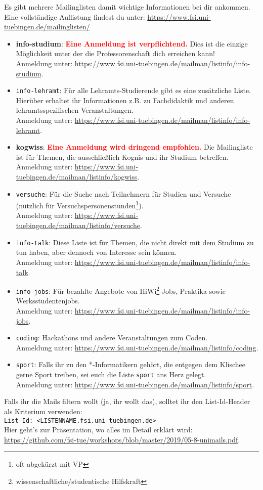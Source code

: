 Es gibt mehrere Mailinglisten damit wichtige Informationen bei dir ankommen.\\
Eine vollständige Auflistung findest du unter: \url{https://www.fsi.uni-tuebingen.de/mailinglisten/}
\begin{itemize}
\item \textbf{info-studium}: \textcolor{red}{\textbf{Eine Anmeldung ist verpflichtend.}} Dies ist die einzige Möglichkeit unter der die Professorenschaft dich erreichen kann! \\
Anmeldung unter: \url{https://www.fsi.uni-tuebingen.de/mailman/listinfo/info-studium}.
\iflehramt
\item \texttt{info-lehramt}: Für alle Lehramts-Studierende gibt es eine zusätzliche Liste. Hierüber erhaltet ihr Informationen z.B. zu Fachdidaktik und anderen lehramtsspezifischen Veranstaltungen.\\
Anmeldung unter: \url{https://www.fsi.uni-tuebingen.de/mailman/listinfo/info-lehramt}.
\fi
\ifkogwiss
\item \textbf{kogwiss}: \textcolor{red}{\textbf{Eine Anmeldung wird dringend empfohlen.}} Die Mailingliste ist für Themen, die ausschließlich Kognis und ihr Studium betreffen. \\
Anmeldung unter: \url{https://www.fsi.uni-tuebingen.de/mailman/listinfo/kogwiss}.

\item \texttt{versuche}: Für die Suche nach Teilnehmern für Studien und Versuche (nützlich für Versuchspersonenstunden\footnote{oft abgekürzt mit VP}).\\
Anmeldung unter: \url{https://www.fsi.uni-tuebingen.de/mailman/listinfo/versuche}.
\fi
\item \texttt{info-talk}: Diese Liste ist für Themen, die nicht direkt mit dem Studium zu tun haben, aber dennoch von Interesse sein können.\\
Anmeldung unter: \url{https://www.fsi.uni-tuebingen.de/mailman/listinfo/info-talk}.
\item \texttt{info-jobs}: Für bezahlte Angebote von HiWi\footnote{wissenschaftliche/studentische Hilfskraft}-Jobs, Praktika sowie  Werksstudentenjobs.\\
Anmeldung unter: \url{https://www.fsi.uni-tuebingen.de/mailman/listinfo/info-jobs}.
\item \texttt{coding}: Hackathons und andere Veranstaltungen zum Coden.\\
Anmeldung unter: \url{https://www.fsi.uni-tuebingen.de/mailman/listinfo/coding}.
\item \texttt{sport}: Falls ihr zu den *-Informatikern gehört, die entgegen dem Klischee gerne Sport treiben, sei euch die Liste \texttt{sport} ans Herz gelegt.\\
Anmeldung unter: \url{https://www.fsi.uni-tuebingen.de/mailman/listinfo/sport}.
\end{itemize}
Falls ihr die Mails filtern wollt (ja, ihr wollt das), solltet ihr den List-Id-Header als Kriterium verwenden: \\
\texttt{List-Id: <LISTENNAME.fsi.uni-tuebingen.de>} \\
Hier geht's zur Präsentation, wo alles im Detail erklärt wird: \url{https://github.com/fsi-tue/workshops/blob/master/2019/05-8-unimails.pdf}.
